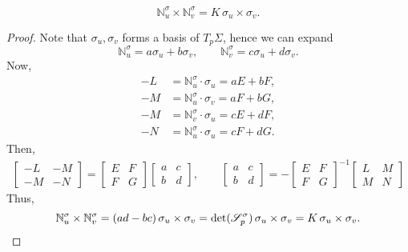 \documentclass[11pt]{article}
\newcommand{\N}{\mathbb{N}}
\theoremstyle{definition}
\theoremstyle{remark}
\numberwithin{equation}{section}
\begin{document}
    \begin{lemma}
        \[
            \N^\sigma_u \times \N^\sigma_v = K\, \sigma_u \times \sigma_v.
        \] 
    \end{lemma}
    \begin{proof}
        Note that $\sigma_u, \sigma_v$ forms a basis of $T_p\Sigma$, hence we can
        expand \[
            \N^\sigma_u = a\sigma_u + b\sigma_v, \qquad
            \N^\sigma_v = c\sigma_u + d\sigma_v.
        \] Now, \begin{align*}
            -L &= \N^\sigma_u \cdot \sigma_u = aE + bF, \\
            -M &= \N^\sigma_u \cdot \sigma_v = aF + bG, \\
            -M &= \N^\sigma_v \cdot \sigma_u = cE + dF, \\
            -N &= \N^\sigma_u \cdot \sigma_u = cF + dG.
        \end{align*} Then, \begin{align*}
            \begin{bmatrix}
                -L & -M \\ -M & -N
            \end{bmatrix} = \begin{bmatrix}
                E & F \\ F & G
            \end{bmatrix} \begin{bmatrix}
                a & c \\ b & d
            \end{bmatrix} , \qquad
            \begin{bmatrix}
                a & c \\ b & d 
            \end{bmatrix} = -\begin{bmatrix}
                E & F \\ F & G
            \end{bmatrix}^{-1} \begin{bmatrix}
                L & M \\ M & N
            \end{bmatrix}
        \end{align*}
        Thus, \[
            \N^\sigma_u \times \N^\sigma_v = (ad - bc)\,\sigma_u \times \sigma_v =
            \det(\mathscr{S}_p^\sigma)\,\sigma_u \times \sigma_v = K\,\sigma_u \times
            \sigma_v. \qedhere
        \] 
    \end{proof}
\end{document}
